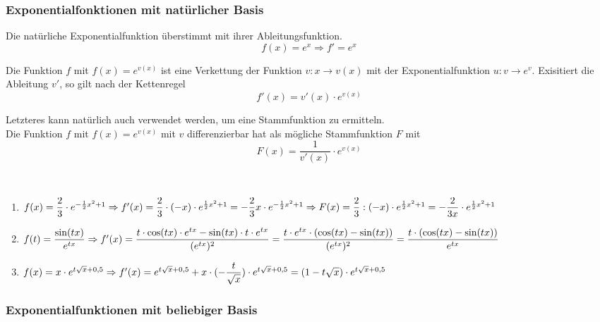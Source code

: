 \subsubsection{Exponentialfonktionen mit natürlicher Basis}

\begin{Theorem}
Die natürliche Exponentialfunktion überstimmt mit ihrer Ableitungsfunktion. 
$$f(x)=e^x\Rightarrow f'=e^x$$
\end{Theorem}
\begin{Theorem}
Die Funktion $f$ mit $f(x)=e^{v(x)}$ ist eine Verkettung der Funktion $v:x\rightarrow v(x)$ mit der Exponentialfunktion $u: v \rightarrow e^v$. Exisitiert die Ableitung $v'$, so gilt nach der Kettenregel\\
$$f'(x)=v'(x)\cdot e^{v(x)}$$
\end{Theorem}
\begin{Bemerkung}
Letzteres kann natürlich auch verwendet werden, um eine Stammfunktion zu ermitteln.\\
Die Funktion $f$ mit $f(x)=e^{v(x)}$ mit $v$ differenzierbar hat als mögliche Stammfunktion $F$ mit
$$F(x)=\dfrac{1}{v'(x)}\cdot e^{v(x)}$$
\end{Bemerkung}
\begin{Beispiel}
\\
\begin{enumerate}
\item$f(x)=\dfrac{2}{3} \cdot e^{-\frac{1}{2}x^2+1}\\
\Rightarrow f'(x)= \dfrac{2}{3}\cdot(-x)\cdot e^{\frac{1}{2}x^2+1}= -\dfrac{2}{3}x\cdot e^{-\frac{1}{2}x^2+1}\\
\Rightarrow F(x)=\dfrac{2}{3}:(-x)\cdot e^{\frac{1}{2}x^2+1}=-\dfrac{2}{3x}\cdot e^{\frac{1}{2}x^2+1}$\\
\item$f(t)=\dfrac{\sin(tx)}{e^{tx}}\\
\Rightarrow f'(x)=\dfrac{t\cdot\cos(tx)\cdot e^{tx}-\sin(tx)\cdot t\cdot e^{tx}}{(e^{tx})^2}=\dfrac{t\cdot e^{tx}\cdot(\cos(tx)-\sin(tx))}{(e^{tx})^2}=\dfrac{t\cdot(\cos(tx)-\sin(tx))}{e^{tx}}\\$
\item$f(x)=x\cdot e^{t\sqrt{x}+0,5}\\
\Rightarrow f'(x)=e^{t\sqrt{x}+0,5}+x\cdot (-\dfrac{t}{\sqrt{x}})\cdot e^{t\sqrt{x}+0,5}=(1-t\sqrt{x})\cdot e^{t\sqrt{x}+0,5}$
\end{enumerate}
\end{Beispiel}

\subsubsection{Exponentialfunktionen mit beliebiger Basis}

